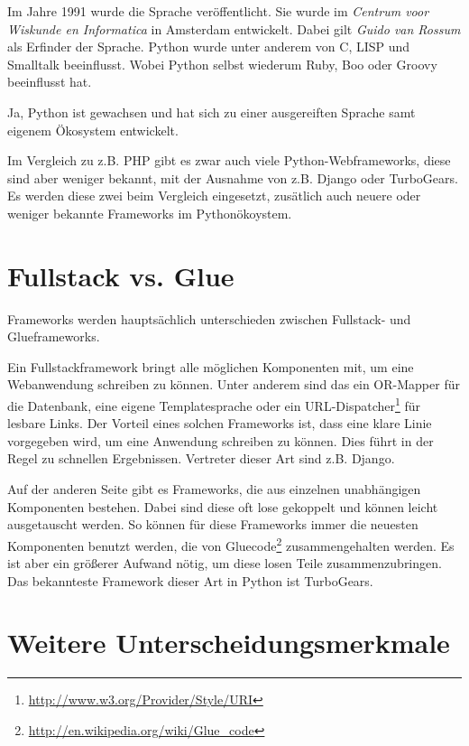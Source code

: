 Im Jahre 1991 wurde die Sprache veröffentlicht. Sie wurde im \emph{Centrum voor
Wiskunde en Informatica} in Amsterdam entwickelt. Dabei gilt \emph{Guido van
Rossum} als Erfinder der Sprache. Python wurde unter anderem von C, LISP und
Smalltalk beeinflusst. Wobei Python selbst wiederum Ruby, Boo oder Groovy
beeinflusst hat.

Ja, Python ist gewachsen und hat sich zu einer ausgereiften Sprache samt
eigenem Ökosystem entwickelt.\cite{Python08}

Im Vergleich zu z.B. PHP\cite{phpwebframeworks} gibt es zwar auch viele
Python-Webframeworks\cite{pythonwebframeworks}, diese sind aber weniger
bekannt, mit der Ausnahme von z.B. Django oder TurboGears. Es werden diese zwei
beim Vergleich eingesetzt, zusätlich auch neuere oder weniger bekannte
Frameworks im Pythonökoystem.


\section{Fullstack vs. Glue}
Frameworks werden hauptsächlich unterschieden zwischen Fullstack- und
Glueframeworks.

Ein Fullstackframework bringt alle möglichen Komponenten mit,
um eine Webanwendung schreiben zu können. Unter anderem sind das ein OR-Mapper
für die Datenbank, eine eigene Templatesprache oder ein
URL-Dispatcher\footnote{\url{http://www.w3.org/Provider/Style/URI}} für lesbare
Links. Der Vorteil eines solchen Frameworks ist, dass eine klare Linie 
vorgegeben wird, um eine Anwendung schreiben zu können. Dies führt in der Regel
zu schnellen Ergebnissen. Vertreter dieser Art sind z.B. Django.

Auf der anderen Seite gibt es Frameworks, die aus einzelnen
unabhängigen Komponenten bestehen. Dabei sind diese oft lose gekoppelt und
können leicht ausgetauscht werden. So können für diese Frameworks immer die 
neuesten Komponenten benutzt werden, die von
Gluecode\footnote{\url{http://en.wikipedia.org/wiki/Glue_code}} zusammengehalten
werden. Es ist aber ein größerer Aufwand nötig, um diese losen Teile 
zusammenzubringen. Das bekannteste Framework dieser Art in Python ist TurboGears.

\section{Weitere Unterscheidungsmerkmale}
